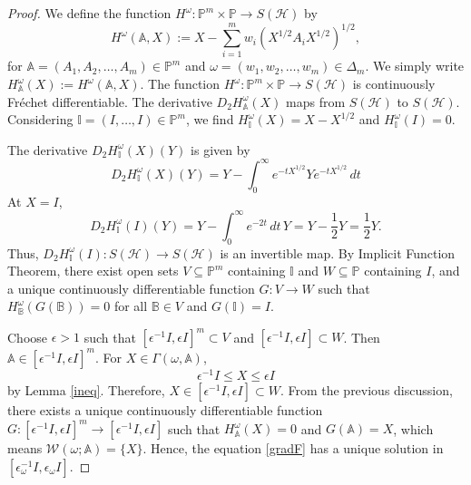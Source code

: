 \documentclass[12pt,reqno]{amsart}
\begin{document}
\begin{proof}
We define the function $H^{\omega} : \mathbb{P}^m \times \mathbb{P} \rightarrow S(\mathcal{H})$ by
\begin{displaymath}
H^{\omega} (\mathbb{A}, X) := X - \sum_{i=1}^{m} w_{i} (X^{1/2} A_{i} X^{1/2})^{1/2},
\end{displaymath}
for $\mathbb{A} = (A_1, A_2, \ldots, A_m) \in \mathbb{P}^m$ and $\omega = (w_{1}, w_{2}, \dots, w_{m}) \in \Delta_{m}$. We simply write $H^{\omega}_{\mathbb{A}}(X) := H^{\omega}(\mathbb{A}, X)$. The function $H^{\omega}: \mathbb{P}^m \times \mathbb{P} \rightarrow S(\mathcal{H})$ is continuously Fréchet differentiable.
The derivative $D_2 H^{\omega}_{\mathbb{A}}(X)$ maps from $S(\mathcal{H})$ to $S(\mathcal{H})$. Considering $\mathbb{I} = (I, \ldots, I) \in \mathbb{P}^m$, we find $H^{\omega}_{\mathbb{I}}(X) = X - X^{1/2}$ and $H^{\omega}_{\mathbb{I}}(I) = 0$.

The derivative $D_2 H^{\omega}_{\mathbb{I}}(X)(Y)$ is given by
\begin{displaymath}
D_2 H^{\omega}_{\mathbb{I}}(X)(Y) = Y - \int_0^\infty e^{-t X^{1/2}} Y e^{-t X^{1/2}} \, dt
\end{displaymath}
At $X = I$,
\begin{displaymath}
D_2 H^{\omega}_{\mathbb{I}}(I)(Y) = Y - \int_0^\infty e^{-2t} \, dt \, Y = Y - \frac{1}{2} Y = \frac{1}{2} Y.
\end{displaymath}
Thus, $D_2 H^{\omega}_{\mathbb{I}} (I) : S (\mathcal{H}) \rightarrow S (\mathcal{H})$ is an invertible map.
By Implicit Function Theorem, there exist open sets $V \subseteq \mathbb{P}^m$ containing $\mathbb{I}$ and $W \subseteq \mathbb{P}$ containing $I$, and a unique continuously differentiable function $G : V \rightarrow W$ such that $H^{\omega}_{\mathbb{B}} ( G(\mathbb{B})) = 0$ for all $\mathbb{B} \in V$ and $G(\mathbb{I}) = I$.

Choose $\epsilon >1$ such that $[\epsilon^{-1} I , \epsilon I]^m \subset V$ and $[\epsilon^{-1} I, \epsilon I] \subset W$. Then $\mathbb{A} \in [\epsilon^{-1} I, \epsilon I]^m$.
For $X \in \Gamma(\omega, \mathbb{A} )$,
\begin{displaymath}
\epsilon^{-1} I \leq X \leq \epsilon I
\end{displaymath}
by Lemma \ref{ineq}.
Therefore, $X \in [\epsilon^{-1} I, \epsilon I] \subset W$. From the previous discussion, there exists a unique continuously differentiable function $G: [\epsilon^{-1} I , \epsilon I]^m \to [\epsilon^{-1} I , \epsilon I]$ such that $H^{\omega}_{\mathbb{A}} (X) = 0$ and $G(\mathbb{A}) = X$, which means $\mathcal{W}(\omega; \mathbb{A}) = \{ X \}$.
Hence, the equation \eqref{gradF} has a unique solution in $[\epsilon_{\omega}^{-1} I, \epsilon_{\omega} I]$.
\end{proof}
\end{document}
